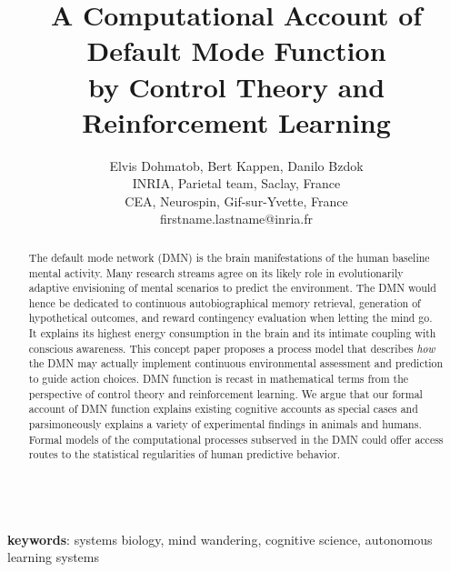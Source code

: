 \documentclass{article} %
\title{A Computational Account of Default Mode Function\\
by Control Theory and Reinforcement Learning}
\begin{document}
\author{Elvis Dohmatob, Bert Kappen, Danilo Bzdok\\
  INRIA, Parietal team, Saclay, France\\
  CEA, Neurospin, Gif-sur-Yvette, France\\
  firstname.lastname@inria.fr}

\maketitle


\begin{abstract}
The default mode network (DMN) is the brain manifestations of the human
baseline mental activity.
%
Many research streams agree on its likely role in evolutionarily adaptive
envisioning of mental scenarios to predict the environment.
The DMN would hence be dedicated to continuous autobiographical memory retrieval,
generation of hypothetical outcomes,
and reward contingency evaluation when letting the mind go.
It explains its highest energy consumption in the brain and
its intimate coupling with conscious awareness.
%
This concept paper proposes a process model that describes
\textit{how} the DMN may actually implement continuous
environmental assessment and prediction to guide action choices.
DMN function is recast in mathematical terms
from the perspective of control theory and
reinforcement learning.
We argue that our formal account of DMN function
explains existing cognitive accounts as special cases and
parsimoneously explains a variety of experimental findings
in animals and humans.
%
Formal models of the computational processes subserved in the DMN
could offer access routes to the statistical regularities
of human predictive behavior.
\end{abstract}

\textbf{\\keywords}: systems biology, mind wandering, cognitive science,
autonomous learning systems

\tableofcontents
\listoffigures
\listoftables
\end{document}
